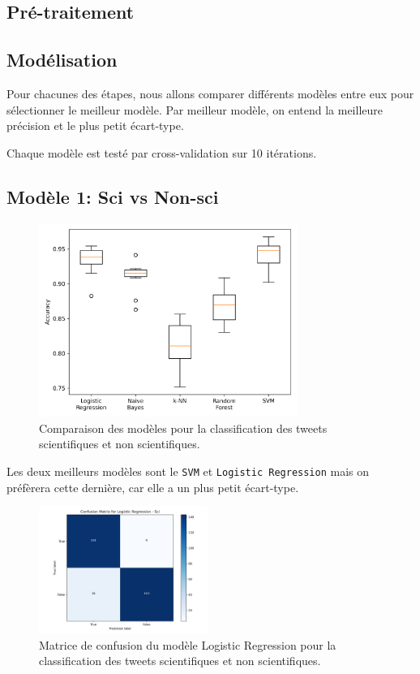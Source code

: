 \subsection{Pré-traitement}\label{subsec:pre-traitement}


\subsection{Modélisation}\label{subsec:modelisation}
Pour chacunes des étapes, nous allons comparer différents modèles entre eux pour sélectionner le meilleur modèle.
Par meilleur modèle, on entend la meilleure précision et le plus petit écart-type.

Chaque modèle est testé par cross-validation sur 10 itérations.

\subsection{Modèle 1: Sci vs Non-sci}\label{subsec:modele-1:-sci-vs-non-sci}

\begin{figure}[H]
    \centering
    \includegraphics[width=0.75\textwidth]{images/model_comparison_1}
    \caption{Comparaison des modèles pour la classification des tweets scientifiques et non scientifiques.}
    \label{fig:model_comparison_sci_nsci}
\end{figure}

Les deux meilleurs modèles sont le \texttt{SVM} et \texttt{Logistic Regression} mais on préfèrera cette dernière, car elle a un plus petit écart-type.

\begin{figure}[H]
    \centering
    \includegraphics[width=0.49\textwidth]{images/confusion_1.json-Logistic Regression_Sci_confusion_matrix}
    \caption{Matrice de confusion du modèle Logistic Regression pour la classification des tweets scientifiques et non scientifiques.}
    \label{fig:confusion_1.json-logistic-regression_sci_confusion_matrix}
\end{figure}

